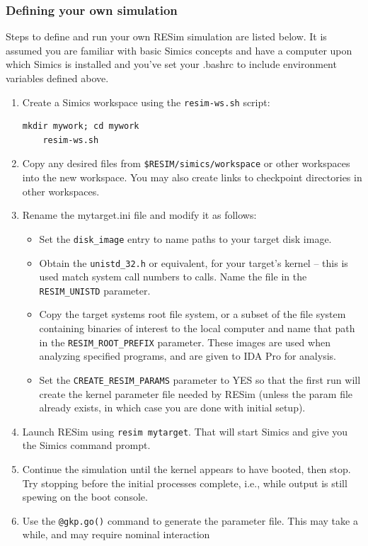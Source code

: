 \documentclass[titlepage]{article}
\begin{document}
\subsubsection{Defining your own simulation}
Steps to define and run your own RESim simulation are listed below.  It is assumed you are familiar with basic Simics concepts and have a
computer upon which Simics is installed and you've set your .bashrc to include environment variables defined above.
\begin{enumerate}
\item Create a Simics workspace using the {\tt resim-ws.sh} script:
\begin{verbatim}
mkdir mywork; cd mywork
    resim-ws.sh 
\end{verbatim}

\item Copy any desired files from {\tt \$RESIM/simics/workspace} or other workspaces into the new workspace.  You may also create links
to checkpoint directories in other workspaces.
\item Rename the mytarget.ini file and modify it as follows:
\begin{itemize}
\item Set the {\tt disk\_image} entry to name paths to your target disk image.
\item Obtain the {\tt unistd\_32.h} or equivalent, for your target's kernel -- this is used match system call numbers to calls.  Name
the file in the {\tt RESIM\_UNISTD} parameter.
\item Copy the target systems root file system, or a subset of the file system containing binaries of interest to the local computer
and name that path in the {\tt RESIM\_ROOT\_PREFIX} parameter.  These images are used when analyzing specified programs, and are given
to IDA Pro for analysis.
\item Set the {\tt CREATE\_RESIM\_PARAMS} parameter to YES so that the first run will create the kernel parameter file needed by RESim
(unless the param file already exists, in which case you are done with initial setup).  
\end{itemize}
\item Launch RESim using {\tt resim mytarget}.  That will start Simics and give you the Simics command prompt.
\item  Continue the simulation until the kernel appears to have booted, then stop.  Try stopping before the initial processes complete, i.e.,
while output is still spewing on the boot console.
\item Use the {\tt @gkp.go()} command to generate the parameter file.  This may take a while, and may require nominal interaction

\end{enumerate}
\end{document}
